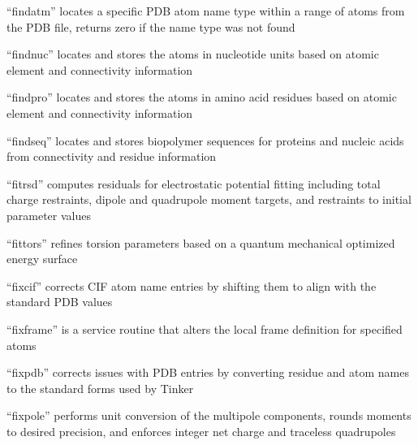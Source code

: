 \documentclass[letterpaper,11pt,english]{sphinxmanual}
\begin{document}
\sphinxAtStartPar
“findatm” locates a specific PDB atom name type within a range of atoms from the PDB file, returns zero if the name type was not found

\sphinxAtStartPar
{}

\sphinxAtStartPar
“findnuc” locates and stores the atoms in nucleotide units based on atomic element and connectivity information

\sphinxAtStartPar
{}

\sphinxAtStartPar
“findpro” locates and stores the atoms in amino acid residues based on atomic element and connectivity information

\sphinxAtStartPar
{}

\sphinxAtStartPar
“findseq” locates and stores biopolymer sequences for proteins and nucleic acids from connectivity and residue information

\sphinxAtStartPar
{}

\sphinxAtStartPar
“fitrsd” computes residuals for electrostatic potential fitting including total charge restraints, dipole and quadrupole moment targets, and restraints to initial parameter values

\sphinxAtStartPar
{}

\sphinxAtStartPar
“fittors” refines torsion parameters based on a quantum mechanical optimized energy surface

\sphinxAtStartPar
{}

\sphinxAtStartPar
“fixcif” corrects CIF atom name entries by shifting them to align with the standard PDB values

\sphinxAtStartPar
{}

\sphinxAtStartPar
“fixframe” is a service routine that alters the local frame definition for specified atoms

\sphinxAtStartPar
{}

\sphinxAtStartPar
“fixpdb” corrects issues with PDB entries by converting residue and atom names to the standard forms used by Tinker

\sphinxAtStartPar
{}

\sphinxAtStartPar
“fixpole” performs unit conversion of the multipole components, rounds moments to desired precision, and enforces integer net charge and traceless quadrupoles
\end{document}
